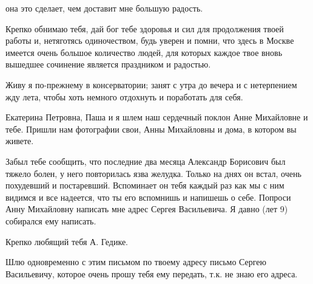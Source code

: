 \noindent
она это сделает, чем доставит мне
большую радость.

Крепко обнимаю тебя, дай бог тебе
здоровья и сил для продолжения твоей
работы и, нетяготясь одиночеством,
будь уверен и помни, что здесь в Москве
имеется очень большое количество
людей, для которых каждое твое
вновь вышедшее сочинение является
праздником и радостью.

Живу я по-прежнему в консерватории;
занят с утра до вечера и с нетерпением жду лета, чтобы хоть немного
отдохнуть и поработать для себя.

Екатерина Петровна, Паша и я шлем наш
сердечный поклон Анне Михайловне и тебе.
Пришли нам фотографии свои, Анны Михайловны
и дома, в котором вы живете.

Забыл тебе сообщить, что последние
два месяца Александр Борисович был тяжело болен,
у него повторилась язва желудка. Только
на днях он встал, очень похудевший и постаревший.
Вспоминает он тебя каждый раз как мы с ним видимся
и все надеется, что ты его вспомнишь и напишешь
о себе. Попроси Анну Михайловну написать мне адрес
Сергея Васильевича. Я давно (лет 9) собирался ему написать.

Крепко любящий тебя А. Гедике.


Шлю одновременно с этим письмом по твоему адресу письмо Сергею Васильевичу,
которое очень прошу тебя ему передать, т.к. не знаю его адреса.
